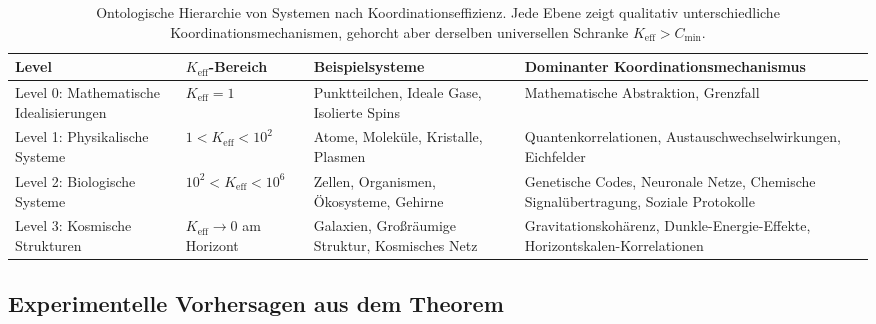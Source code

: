 \documentclass[11pt,a4paper]{article}
\begin{document}
	\begin{table}[htbp]
		\centering
		\small
		\begin{tabular}{|p{}|p{}|p{}|p{}|}
			\hline
			\textbf{Level} & \textbf{$K_{\mathrm{eff}}$-Bereich} & \textbf{Beispielsysteme} & \textbf{Dominanter Koordinationsmechanismus} \\
			\hline
			Level 0: Mathematische Idealisierungen & $K_{\mathrm{eff}} = 1$ & Punktteilchen, Ideale Gase, Isolierte Spins & Mathematische Abstraktion, Grenzfall \\
			\hline
			Level 1: Physikalische Systeme & $1 < K_{\mathrm{eff}} < 10^2$ & Atome, Moleküle, Kristalle, Plasmen & Quantenkorrelationen, Austauschwechselwirkungen, Eichfelder \\
			\hline
			Level 2: Biologische Systeme & $10^2 < K_{\mathrm{eff}} < 10^6$ & Zellen, Organismen, Ökosysteme, Gehirne & Genetische Codes, Neuronale Netze, Chemische Signalübertragung, Soziale Protokolle \\
			\hline
			Level 3: Kosmische Strukturen & $K_{\mathrm{eff}} \to 0$ am Horizont & Galaxien, Großräumige Struktur, Kosmisches Netz & Gravitationskohärenz, Dunkle-Energie-Effekte, Horizontskalen-Korrelationen \\
			\hline
		\end{tabular}
		\caption{Ontologische Hierarchie von Systemen nach Koordinationseffizienz. Jede Ebene zeigt qualitativ unterschiedliche Koordinationsmechanismen, gehorcht aber derselben universellen Schranke $K_{\mathrm{eff}} > C_{\min}$.}
		\label{tab:ontology-hierarchy}
	\end{table}
	
	\subsection{Experimentelle Vorhersagen aus dem Theorem}
	
\end{document}
